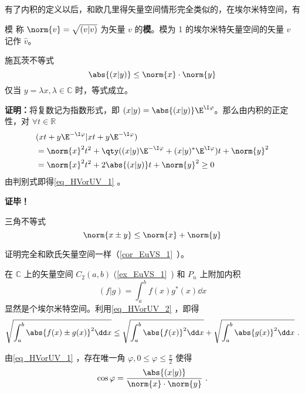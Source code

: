 有了内积的定义以后，和欧几里得矢量空间情形完全类似的，在埃尔米特空间，有
\begin{definition}{模}
称 $\norm{  v}=\sqrt{(  v|  v)}$ 为矢量 $  v$ 的\textbf{模}。模为 1 的埃尔米特矢量空间的矢量 $v$ 记作 $\hat{v}$。
\end{definition} 
\begin{theorem}{施瓦茨不等式}
\begin{equation}\label{eq_HVorUV_1}
\abs{(  x|  y)}\leq \norm{  x}\cdot \norm{  y}
\end{equation}
仅当 $  y=\lambda  x,\lambda\in\mathbb{C}$ 时，等式成立。
\end{theorem}
\textbf{证明：}将复数记为指数形式，即 $(  x|  y)=\abs{(  x|  y)}\E^{\I \varphi}$。那么由内积的正定性，对 $\forall t\in\mathbb{R}$
\begin{equation}
\begin{aligned}
&(  x t+  y\E^{-\I\varphi}|  x t+  y\E^{-\I\varphi})\\
&=\norm{  x}^2t^2+\qty((  x|  y)\E^{-\I\varphi}+(  x|  y)^*\E^{\I\varphi})t+\norm{  y}^2\\
&=\norm{  x}^2t^2+2\abs{(  x|  y)}t+\norm{  y}^2\geq0
\end{aligned}
\end{equation}
由判别式即得\autoref{eq_HVorUV_1} 。

\textbf{证毕！}
\begin{corollary}{三角不等式}
\begin{equation}\label{eq_HVorUV_2}
\norm{  x\pm  y}\leq\norm{  x}+\norm{  y}
\end{equation}
\end{corollary}
证明完全和欧氏矢量空间一样（\autoref{cor_EuVS_1}~）。
\begin{example}{}\label{ex_HVorUV_1}
在 $\mathbb{C}$ 上的矢量空间 $C_2(a,b)$ (\autoref{ex_EuVS_1}~) 和 $P_n$ 上附加内积
\begin{equation}
(f|g)=\int_a^{b}f(x)g^*(x)\dd x
\end{equation}
显然是个埃尔米特空间。利用\autoref{eq_HVorUV_2} ，即得
\begin{equation}
\sqrt{\int_a^b\abs{f(x)\pm g(x)}^2\dd x}\leq\sqrt{\int_a^b\abs{f(x)}^2\dd x}+\sqrt{\int_a^b\abs{g(x)}^2\dd x}~.
\end{equation}
\end{example}
由\autoref{eq_HVorUV_1} ，存在唯一角 $\varphi,0\leq\varphi\leq\frac{\pi}{2}$ 使得
\begin{equation}
\cos\varphi=\frac{\abs{(  x|  y)}}{\norm{  x}\cdot \norm{  y}}~.
\end{equation}
